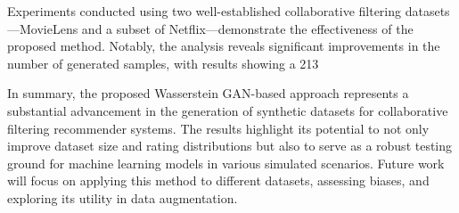 \documentclass[runningheads]{llncs}
\begin{document}
Experiments conducted using two well-established collaborative filtering datasets—MovieLens and a subset of Netflix—demonstrate the effectiveness of the proposed method. Notably, the analysis reveals significant improvements in the number of generated samples, with results showing a 213%

In summary, the proposed Wasserstein GAN-based approach represents a substantial advancement in the generation of synthetic datasets for collaborative filtering recommender systems. The results highlight its potential to not only improve dataset size and rating distributions but also to serve as a robust testing ground for machine learning models in various simulated scenarios. Future work will focus on applying this method to different datasets, assessing biases, and exploring its utility in data augmentation.
\end{document}
